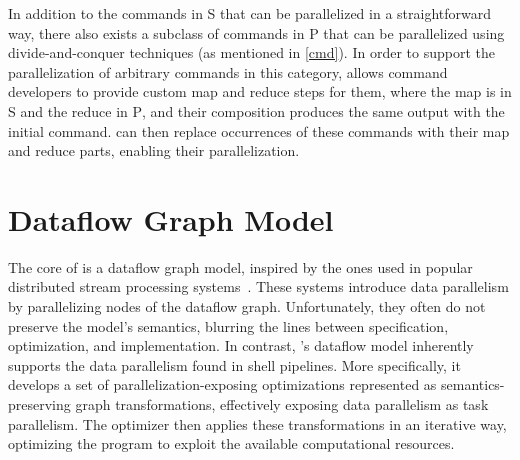 \documentclass[acmsmall,10pt,review,anonymous]{acmart}
\newcommand{\cn}[1]{\mbox{\textcircled{\footnotesize #1}}}
\newcommand{\pur}{\cn{\textsc{P}}\xspace}
\newcommand{\sta}{\cn{\textsc{S}}\xspace}
\newcommand{\nv}[1]{[{\color{cyan}#1 --- nv}]}
\newcommand{\kk}[1]{[{\color{magenta}#1 --- kk}]}
\newcommand{\tr}[1]{} %
\begin{document}
%
\noindent
In addition to the commands in \sta that can be parallelized in a
straightforward way, there also exists a subclass of commands in \pur
that can be parallelized using divide-and-conquer techniques (as
mentioned in \cref{cmd}). In order to support the parallelization of
arbitrary commands in this category, \sys allows command developers to
provide custom map and reduce steps for them, where the map
is in \sta and the reduce in \pur, and their composition produces the
same output with the initial command. \sys can then replace occurrences
of these commands with their map and reduce parts, enabling their
parallelization.


\tr{\kk{I am not sure a general interface is so easy to design. It needs
  more though. It might be beneficial to just talk about sort and wc
  here and how we implemented them and nothing more. Or maybe this
  could then go to the implementation? Or maybe say that one can write
  a python function that given a node of the graph, transforms it into
  many. I am not sure what is best...}}


\tr{Can we find a solution for the commands in coreutils?}


\section{Dataflow Graph Model}
\label{ir}

The core of \sys is a dataflow graph model, inspired by the ones used in popular distributed stream processing systems~.
These systems introduce data parallelism by parallelizing nodes of the dataflow graph.
Unfortunately, %
 they often do not preserve the model's semantics, blurring the lines between specification, optimization, and implementation.
In contrast, \sys's dataflow model inherently supports the data parallelism found in shell pipelines.
More specifically, it develops a set of parallelization-exposing optimizations represented as semantics-preserving graph transformations, effectively exposing data parallelism as task parallelism.
The \sys optimizer then applies these transformations in an iterative way, optimizing the program to exploit the available computational resources.
\end{document}
